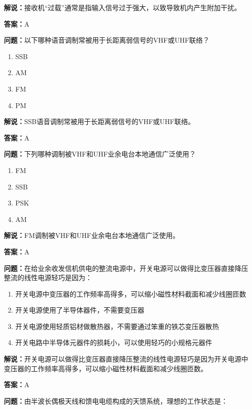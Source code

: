 \documentclass[UTF8]{ctexbook}
\begin{document}
\textbf{解说：}接收机“过载”通常是指输入信号过于强大，以致导致机内产生附加干扰。%

\textbf{答案：}A

\textbf{问题：}以下哪种语音调制常被用于长距离弱信号的VHF或UHF联络？

\begin{enumerate}[label=\Alph*), leftmargin=3em]
  \item SSB
  \item AM
  \item FM
  \item PM
\end{enumerate}

\textbf{解说：}SSB语音调制常被用于长距离弱信号的VHF或UHF联络。%

\textbf{答案：}A

\textbf{问题：}下列哪种调制被VHF和UHF业余电台本地通信广泛使用？

\begin{enumerate}[label=\Alph*), leftmargin=3em]
  \item FM
  \item SSB
  \item PSK
  \item AM
\end{enumerate}

\textbf{解说：}FM调制被VHF和UHF业余电台本地通信广泛使用。%

\textbf{答案：}A

\textbf{问题：}在给业余收发信机供电的整流电源中，开关电源可以做得比变压器直接降压整流的线性电源轻巧是因为：

\begin{enumerate}[label=\Alph*), leftmargin=3em]
  \item 开关电源中变压器的工作频率高得多，可以缩小磁性材料截面和减少线圈匝数
  \item 开关电源使用了半导体器件，不需要变压器
  \item 开关电源使用轻质铝材做散热器，不需要通过笨重的铁芯变压器散热
  \item 开关电路中半导体元器件的损耗小，可以使用轻巧的小规格元器件
\end{enumerate}

\textbf{解说：}开关电源可以做得比变压器直接降压整流的线性电源轻巧是因为开关电源中变压器的工作频率高得多，可以缩小磁性材料截面和减少线圈匝数。%

\textbf{答案：}A

\textbf{问题：}由半波长偶极天线和馈电电缆构成的天馈系统，理想的工作状态是：
\end{document}
